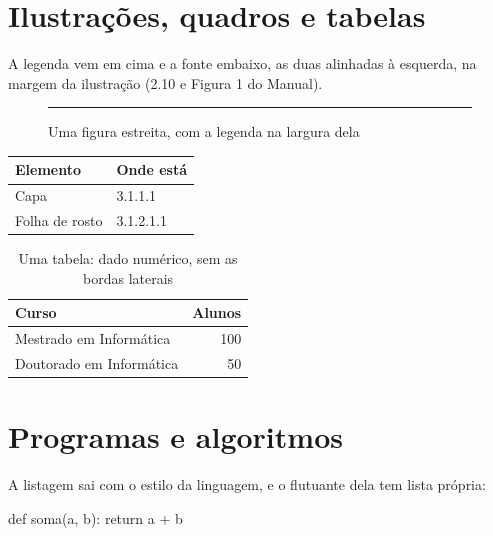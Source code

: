\documentclass[dsc]{ufrj}
\begin{document}
  \chapter{Ilustrações, quadros e tabelas}
  \label{cap:ilustracoes}

  A legenda vem em cima e a fonte embaixo, as duas alinhadas à esquerda, na
  margem da ilustração (2.10 e Figura 1 do Manual).

  \begin{figure}[htbp]
    \caption{Uma figura estreita, com a legenda na largura dela}
    \illustrationwidth{6cm}
    \centering
    \rule{6cm}{3cm}
  \end{figure}

  \begin{quadro}[htbp]
    \caption{Um quadro: informação textual, com as quatro bordas}
    \centering
    \begin{tabular}{|l|l|}
      \hline
      Elemento & Onde está \\
      \hline
      Capa & 3.1.1.1 \\
      Folha de rosto & 3.1.2.1.1 \\
      \hline
    \end{tabular}
  \end{quadro}

  \begin{table}[htbp]
    \caption{Uma tabela: dado numérico, sem as bordas laterais}
    \centering
    \begin{tabular}{lr}
      \hline
      Curso & Alunos \\
      \hline
      Mestrado em Informática & 100 \\
      Doutorado em Informática & 50 \\
      \hline
    \end{tabular}
  \end{table}

  \chapter{Programas e algoritmos}
  \label{cap:programa}
  A listagem sai com o estilo da linguagem, e o flutuante dela tem lista
  própria:

  \begin{python}[caption={Um programa de exemplo},label={prog:exemplo}]
def soma(a, b):
    return a + b
  \end{python}
\end{document}
